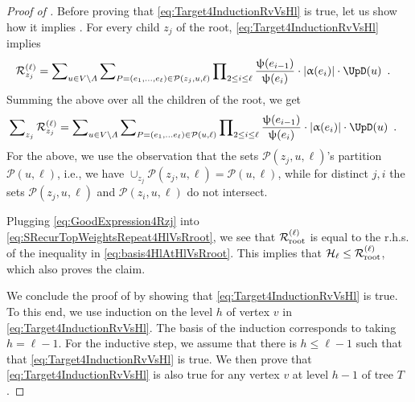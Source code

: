 \documentclass[11pt,reqno]{amsart}
\numberwithin{equation}{section}
\newcommand{\cP}{{\mathcal{P}}}
\newcommand{\applegreen}[1]{ {\color{applegreen}#1}}
\newcommand{\blue}[1]{{\color{blue}#1}}
\newcommand{\capri}[1]{{\color{capri}#1}}
\newcommand{\cadmiumgreen}[1]{{\color{cadmiumgreen}#1}}
\newcommand{\cadmiumorange}[1]{{\color{cadmiumorange}#1}}
\newcommand{\coquelicot}[1]{{\color{coquelicot}#1}}
\newcommand{\electricviolet}[1]{{\color{electricviolet}#1}}
\newcommand{\goldenbrown}[1]{{\color{goldenbrown}#1}}
\newcommand{\red}[1]{{\color{red}#1}}
\newcommand{\abs}[1]{\blue{|}#1\blue{|}}
\renewcommand{\applegreen}[1]{#1}
\renewcommand{\blue}[1]{#1}
\renewcommand{\capri}[1]{#1}
\renewcommand{\cadmiumgreen}[1]{#1}
\renewcommand{\cadmiumorange}[1]{#1}
\renewcommand{\coquelicot}[1]{#1}
\renewcommand{\electricviolet}[1]{#1}
\renewcommand{\goldenbrown}[1]{#1}
\renewcommand{\red}[1]{#1}
\newcommand{\ke}{\blue{e}}
\newcommand{\kh}{\cadmiumorange{h}}
\newcommand{\ki}{\capri{i}}
\newcommand{\kj}{\coquelicot{j}}
\newcommand{\kell}{{\color{green(pigment)}\ell}}%
\newcommand{\kP}{\goldenbrown{P}}
\newcommand{\ku}{\red{u}}
\newcommand{\kv}{\electricviolet{v}}
\newcommand{\kz}{\cadmiumgreen{z}}
\renewcommand{\ke}{e}
\renewcommand{\kh}{h}
\renewcommand{\ki}{i}
\renewcommand{\kj}{j}
\renewcommand{\kell}{\ell}
\renewcommand{\kP}{P}
\renewcommand{\ku}{u}
\renewcommand{\kv}{v}
\renewcommand{\kz}{z}
\newcommand{\infweight}{\upalpha}
\begin{document}
\begin{proof}[Proof of ]
Before proving that \eqref{eq:Target4InductionRvVsHl} is true, let us show how it implies .
%
For every child $\kz_{\kj}$ of the root, \eqref{eq:Target4InductionRvVsHl} implies 
\begin{align}
\subcont_{\kz_{\kj}} & = \sum\nolimits_{\ku\in V\setminus \Lambda} \sum\nolimits_{\kP=(\ke_1,\ldots, \ke_{\kell}) \in \cP(\kz_{\kj}, \ku, \kell) } 
\prod\nolimits_{2\leq \ki\leq \kell} \frac{\chiofh(\ke_{\ki-1})}{\chiofh(\ke_{\ki})}\cdot \abs{\infweight(\ke_{\ki})} \cdot \UpD(\ku) \enspace. 
\end{align}
Summing the above over all the children of the root, we get
\begin{align}\label{eq:GoodExpression4Rzj}
\sum\nolimits_{\kz_{\kj}} \subcont_{\kz_{\kj}} & = \sum\nolimits_{\ku\in V\setminus \Lambda} \sum\nolimits_{\kP=(\ke_1,\ldots \ke_{\kell}) \in \cP(\ku, \kell) } 
\prod\nolimits_{2\leq \ki\leq \kell} \frac{\chiofh(\ke_{\ki-1})}{\chiofh(\ke_{\ki})}\cdot \abs{\infweight(\ke_{\ki})} \cdot \UpD(\ku) \enspace. 
%
\end{align}
For the above, we use the observation that the sets $\cP(\kz_j,\ku,\kell)$'s partition $\cP(\ku,\kell)$, i.e., we have
 $\cup_{\kz_{\kj}}\cP(\kz_{\kj},\ku,\kell)=\cP(\ku,\kell)$, while for  distinct ${\kj}, \ki$ the sets 
$\cP(\kz_{\kj},\ku,\kell)$ and $\cP(\kz_{\ki},\ku,\kell)$ do not intersect. 

 Plugging \eqref{eq:GoodExpression4Rzj} into \eqref{eq:SRecurTopWeightsRepeat4HlVsRroot}, we see that
 $\subcont_{\rm root}$ is equal to the r.h.s. of the inequality in \eqref{eq:basis4HlAtHlVsRroot}. This implies
 that $\inflPotB_{\kell} \leq \subcont_{\rm root}$, which also proves the claim. 



We conclude the proof of  by showing that \eqref{eq:Target4InductionRvVsHl} is true. 
To this end, we use induction on the level $\kh$ of vertex $\kv$ in \eqref{eq:Target4InductionRvVsHl}.
The basis of the induction corresponds to taking $\kh=\kell-1$. For the inductive step, we assume that there is 
$\kh\leq \kell-1$ such that that \eqref{eq:Target4InductionRvVsHl} is true. We then prove that \eqref{eq:Target4InductionRvVsHl} 
is also true for any vertex $\kv$ at level $\kh-1$ of tree $T$. 





\end{proof}
\end{document}
